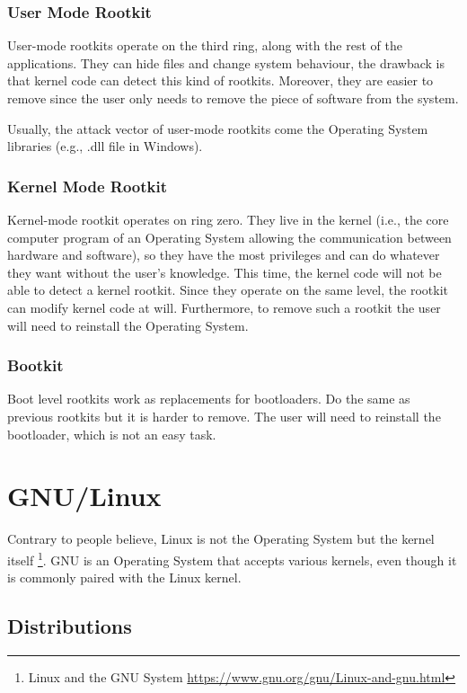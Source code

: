\documentclass[11pt, a4paper,twoside]{tesi_upf}
\begin{document}
\subsubsection{User Mode Rootkit}

User-mode rootkits operate on the third ring, along with the rest of the applications. They can hide files and change system behaviour, the drawback is that kernel code can detect this kind of rootkits. Moreover, they are easier to remove since the user only needs to remove the piece of software from the system.

Usually, the attack vector of user-mode rootkits come the Operating System libraries (e.g., .dll file in Windows).


\subsubsection{Kernel Mode Rootkit}

Kernel-mode rootkit operates on ring zero. They live in the kernel (i.e., the core computer program of an Operating System allowing the communication between hardware and software), so they have the most privileges and can do whatever they want without the user's knowledge. This time, the kernel code will not be able to detect a kernel rootkit. Since they operate on the same level, the rootkit can modify kernel code at will. Furthermore, to remove such a rootkit the user will need to reinstall the Operating System.

\subsubsection{Bootkit}

Boot level rootkits work as replacements for bootloaders. Do the same as previous rootkits but it is harder to remove. The user will need to reinstall the bootloader, which is not an easy task.

\section{GNU/Linux}

Contrary to people believe, Linux is not the Operating System but the kernel itself \footnote{Linux and the GNU System \url{https://www.gnu.org/gnu/Linux-and-gnu.html}}. GNU is an Operating System that accepts various kernels, even though it is commonly paired with the Linux kernel.

\subsection{Distributions}
\end{document}

